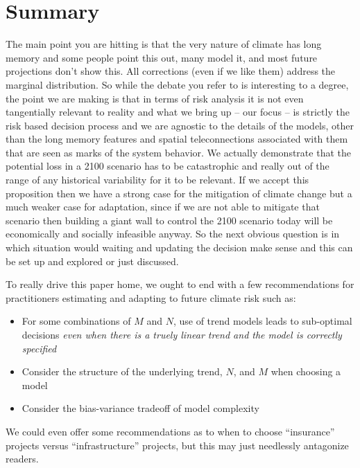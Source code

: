 \documentclass[12pt]{article}
\begin{document}

\section{Summary}

The main point you are hitting is that the very nature of climate has long memory and some people point this out, many model it, and most future projections don't show this.
All corrections (even if we like them) address the marginal distribution.
So while the debate you refer to is interesting to a degree, the point we are making is that in terms of risk analysis it is not even tangentially relevant to reality and what we bring up -- our focus -- is strictly the risk based decision process and we are agnostic to the details of the models, other than the long memory features and spatial teleconnections associated with them that are seen as marks of the system behavior.
We actually demonstrate that the potential loss in a 2100 scenario has to be catastrophic and really out of the range of any historical variability for it to be relevant.
If we accept this proposition then we have a strong case for the mitigation of climate change but a much weaker case for adaptation, since if we are not able to mitigate that scenario then building a giant wall to control the 2100 scenario today will be economically and socially infeasible anyway.
So the next obvious question is in which situation would waiting and updating the decision make sense and this can be set up and explored or just discussed.

To really drive this paper home, we ought to end with a few recommendations for practitioners estimating and adapting to future climate risk such as:
\begin{itemize}
  \item For some combinations of $M$ and $N$, use of trend models leads to sub-optimal decisions \emph{even when there is a truely linear trend and the model is correctly specified}
  \item Consider the structure of the underlying trend, $N$, and $M$ when choosing a model
  \item Consider the bias-variance tradeoff of model complexity
\end{itemize}
We could even offer some recommendations as to when to choose ``insurance'' projects versus ``infrastructure'' projects, but this may just needlessly antagonize readers.
\end{document}
